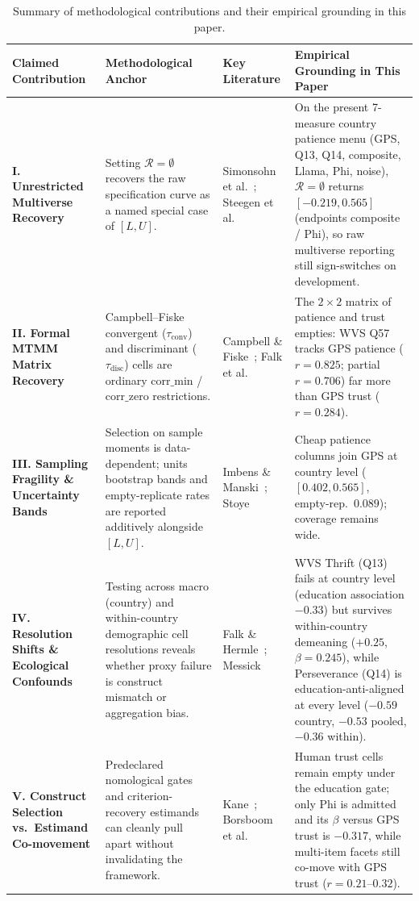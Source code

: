 \documentclass[10pt,letterpaper]{article}
\newcommand{\Rset}{\mathcal{R}}
\begin{document}
\begin{table}[p]
\centering
\small
\caption{Summary of methodological contributions and their empirical grounding in this paper.}
\label{tab:synthesis_contributions}
\begin{tabularx}{\textwidth}{@{}>{\raggedright\arraybackslash}p{2.6cm} >{\raggedright\arraybackslash}p{3.1cm} >{\raggedright\arraybackslash}p{2.6cm} X@{}}
\toprule
\textbf{Claimed Contribution} & \textbf{Methodological Anchor} & \textbf{Key Literature} & \textbf{Empirical Grounding in This Paper} \\
\midrule
\textbf{I. Unrestricted Multiverse Recovery} & Setting $\Rset=\emptyset$ recovers the raw specification curve as a named special case of $[L, U]$. & Simonsohn et al.~\cite{simonsohn2020}; Steegen et al.~\cite{steegen2016} & On the present 7-measure country patience menu (GPS, Q13, Q14, composite, Llama, Phi, noise), $\Rset=\emptyset$ returns $[-0.219, 0.565]$ (endpoints composite / Phi), so raw multiverse reporting still sign-switches on development. \\
\addlinespace
\textbf{II. Formal MTMM Matrix Recovery} & Campbell--Fiske convergent ($\tau_{\text{conv}}$) and discriminant ($\tau_{\text{disc}}$) cells are ordinary $\mathrm{corr\_min}$ / $\mathrm{corr\_zero}$ restrictions. & Campbell \& Fiske~\cite{campbell1959}; Falk et al.~\cite{falk2018} & The $2\times 2$ matrix of patience and trust empties: WVS Q57 tracks GPS patience ($r=0.825$; partial $r=0.706$) far more than GPS trust ($r=0.284$). \\
\addlinespace
\textbf{III. Sampling Fragility \& Uncertainty Bands} & Selection on sample moments is data-dependent; units bootstrap bands and empty-replicate rates are reported additively alongside $[L, U]$. & Imbens \& Manski~\cite{imbensmanski2004}; Stoye~\cite{stoye2009} & Cheap patience columns join GPS at country level ($[0.402,0.565]$, empty-rep.\ $0.089$); coverage remains wide. \\
\addlinespace
\textbf{IV. Resolution Shifts \& Ecological Confounds} & Testing across macro (country) and within-country demographic cell resolutions reveals whether proxy failure is construct mismatch or aggregation bias. & Falk \& Hermle~\cite{falkhermle2018}; Messick~\cite{messick1995} & WVS Thrift (Q13) fails at country level (education association $-0.33$) but survives within-country demeaning ($+0.25$, $\beta=0.245$), while Perseverance (Q14) is education-anti-aligned at every level ($-0.59$ country, $-0.53$ pooled, $-0.36$ within). \\
\addlinespace
\textbf{V. Construct Selection vs.\ Estimand Co-movement} & Predeclared nomological gates and criterion-recovery estimands can cleanly pull apart without invalidating the framework. & Kane~\cite{kane2013}; Borsboom et al.~\cite{borsboom2004} & Human trust cells remain empty under the education gate; only Phi is admitted and its $\beta$ versus GPS trust is $-0.317$, while multi-item facets still co-move with GPS trust ($r=0.21$--$0.32$). \\
\bottomrule
\end{tabularx}
\end{table}
\end{document}
